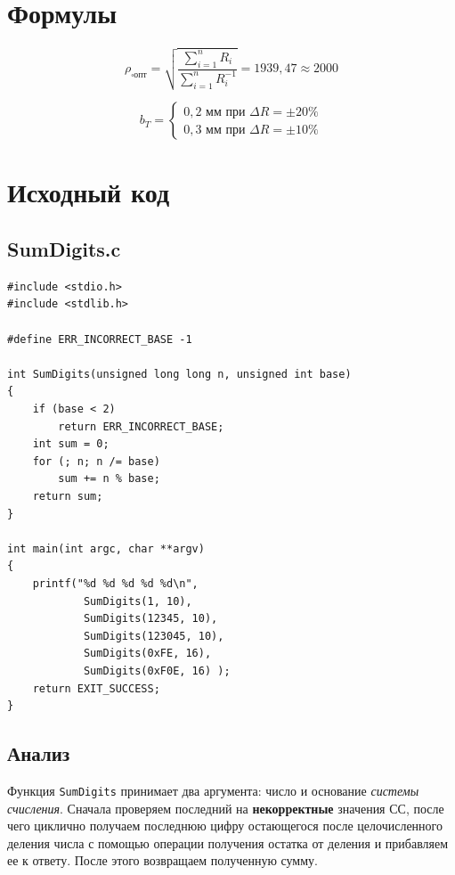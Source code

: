 \documentclass[12pt, a4paper]{article}
\begin{document}
\section{Формулы}

$$\rho_{\square\textrm{опт}}=\sqrt{\frac{\sum\limits_{i=1}^{n} R_{i}}{\sum\limits_{i=1}^{n} R_{i}^{-1}}} = 1939,47 \approx 2000$$

$$b_T = \left\{ \begin{matrix} 0,2 \textrm{ мм при } \Delta R = \pm 20\% \\
0,3 \textrm{ мм при } \Delta R = \pm 10\%\end{matrix} \right. $$

\section{Исходный код}

\subsection{SumDigits.c}
\begin{verbatim}
#include <stdio.h>
#include <stdlib.h>

#define ERR_INCORRECT_BASE -1

int SumDigits(unsigned long long n, unsigned int base)
{
    if (base < 2)
        return ERR_INCORRECT_BASE;
    int sum = 0;
    for (; n; n /= base)
        sum += n % base;
    return sum;
}

int main(int argc, char **argv)
{
    printf("%d %d %d %d %d\n",
            SumDigits(1, 10),
            SumDigits(12345, 10),
            SumDigits(123045, 10),
            SumDigits(0xFE, 16),
            SumDigits(0xF0E, 16) );
    return EXIT_SUCCESS;
}
\end{verbatim}

\subsection{Анализ}
Функция \texttt{SumDigits} принимает два аргумента: число и основание 
\emph{системы счисления}. Сначала проверяем последний на 
\textbf{некорректные} значения СС, после чего циклично получаем последнюю
цифру остающегося после целочисленного деления числа с помощью операции
получения остатка от деления и прибавляем ее к ответу. После этого 
возвращаем полученную сумму.
\end{document}
